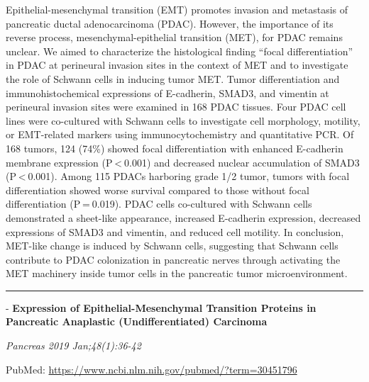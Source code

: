 \documentclass[]{article}
\begin{document}
Epithelial-mesenchymal transition (EMT) promotes invasion and metastasis
of pancreatic ductal adenocarcinoma (PDAC). However, the importance of
its reverse process, mesenchymal-epithelial transition (MET), for PDAC
remains unclear. We aimed to characterize the histological finding
``focal differentiation'' in PDAC at perineural invasion sites in the
context of MET and to investigate the role of Schwann cells in inducing
tumor MET. Tumor differentiation and immunohistochemical expressions of
E-cadherin, SMAD3, and vimentin at perineural invasion sites were
examined in 168 PDAC tissues. Four PDAC cell lines were co-cultured with
Schwann cells to investigate cell morphology, motility, or EMT-related
markers using immunocytochemistry and quantitative PCR. Of 168 tumors,
124 (74\%) showed focal differentiation with enhanced E-cadherin
membrane expression (P \textless{} 0.001) and decreased nuclear
accumulation of SMAD3 (P \textless{} 0.001). Among 115 PDACs harboring
grade 1/2 tumor, tumors with focal differentiation showed worse survival
compared to those without focal differentiation (P = 0.019). PDAC cells
co-cultured with Schwann cells demonstrated a sheet-like appearance,
increased E-cadherin expression, decreased expressions of SMAD3 and
vimentin, and reduced cell motility. In conclusion, MET-like change is
induced by Schwann cells, suggesting that Schwann cells contribute to
PDAC colonization in pancreatic nerves through activating the MET
machinery inside tumor cells in the pancreatic tumor microenvironment.

{}

{}

\begin{center}\rule{0.5\linewidth}{\linethickness}\end{center}

 - \textbf{Expression of Epithelial-Mesenchymal Transition Proteins in
Pancreatic Anaplastic (Undifferentiated) Carcinoma}

\emph{Pancreas 2019 Jan;48(1):36-42}

PubMed: \url{https://www.ncbi.nlm.nih.gov/pubmed/?term=30451796}
\end{document}
